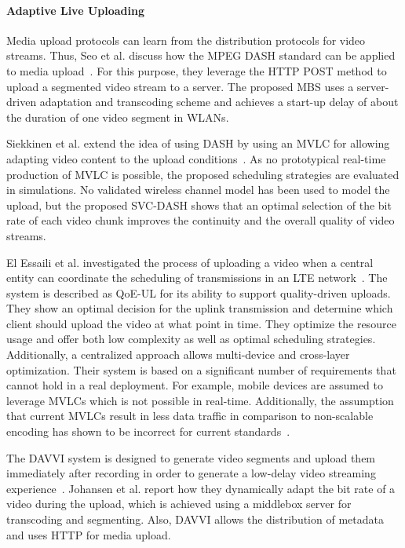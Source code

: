 \paragraph{Adaptive Live Uploading}
Media upload protocols can learn from the distribution protocols for video streams.
Thus, Seo et al. discuss how the \ac{MPEG} \ac{DASH} standard can be applied to media upload~\cite{Seo2012}. 
For this purpose, they leverage the \ac{HTTP} POST method to upload a segmented video stream to a server.
The proposed \ac{MBS} uses a server-driven adaptation and transcoding scheme and achieves a start-up delay of about the duration of one video segment in \ac{WLAN}s.

Siekkinen et al. extend the idea of using \ac{DASH} by using an \ac{MVLC} for allowing adapting video content to the upload conditions~\cite{Siekkinen2016}.
As no prototypical real-time production of \ac{MVLC} is possible, the proposed scheduling strategies are evaluated in simulations.
No validated wireless channel model has been used to model the upload, but the proposed SVC-DASH shows that an optimal selection of the bit rate of each video chunk improves the continuity and the overall quality of video streams. 

El Essaili et al. investigated the process of uploading a video when a central entity can coordinate the scheduling of transmissions in an \ac{LTE} network~\cite{ElEssaili2015}.
The system is described as QoE-UL for its ability to support quality-driven uploads.
They show an optimal decision for the uplink transmission and determine which client should upload the video at what point in time. 
They optimize the resource usage and offer both low complexity as well as optimal scheduling strategies.
Additionally, a centralized approach allows multi-device and cross-layer optimization.
Their system is based on a significant number of requirements that cannot hold in a real deployment. 
For example, mobile devices are assumed to leverage \ac{MVLC}s which is not possible in real-time.
Additionally, the assumption that current \ac{MVLC}s result in less data traffic in comparison to non-scalable encoding has shown to be incorrect for current standards~\cite{Grafl2013}.

The DAVVI system is designed to generate video segments and upload them immediately after recording in order to generate a low-delay video streaming experience~\cite{Johansen2009}. 
Johansen et al. report how they dynamically adapt the bit rate of a video during the upload, which is achieved using a middlebox server for transcoding and segmenting.
Also, DAVVI allows the distribution of metadata and uses \ac{HTTP} for media upload.
